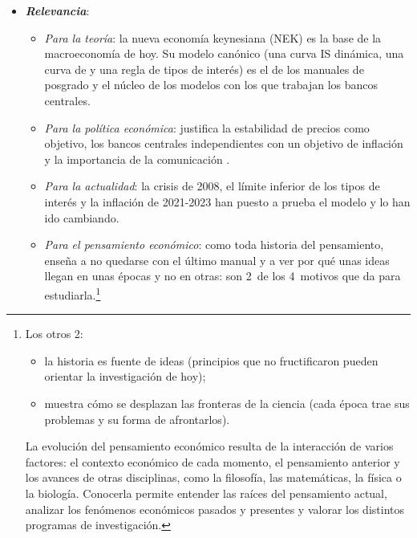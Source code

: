 \documentclass[11pt]{article}
\begin{document}
\begin{itemize}
\item \textbf{\emph{Relevancia}}:
  \begin{itemize}
  \item \emph{Para la teoría}: la nueva economía keynesiana (NEK) es la base de la macroeconomía de hoy. Su modelo canónico (una curva IS dinámica, una curva de  y una regla de tipos de interés) es el de los manuales de posgrado\nocite{Gali2015Monetary} y el núcleo de los modelos con los que trabajan los bancos centrales\nocite{SmetsWouters2007Shocks}.
  \item \emph{Para la política económica}: justifica la estabilidad de precios como objetivo, los bancos centrales independientes con un objetivo de inflación y la importancia de la comunicación\nocite{ClaridaGaliGertler1999Science,Woodford2003Interest} .
  \item \emph{Para la actualidad}: la crisis de 2008, el límite inferior de los tipos de interés y la inflación de 2021-2023 han puesto a prueba el modelo y lo han ido cambiando\nocite{Gali2018State,BernankeBlanchard2025What}.
  \item \emph{Para el pensamiento económico}: como toda historia del pensamiento, enseña a no quedarse con el último manual y a ver por qué unas ideas llegan en unas épocas y no en otras: son 2~de los 4~motivos que da  para estudiarla\nocite{Schumpeter1954History}.\footnote{Los otros 2:
\begin{itemize}
\item la historia es fuente de ideas (principios que no fructificaron pueden orientar la investigación de hoy);
\item muestra cómo se desplazan las fronteras de la ciencia (cada época trae sus problemas y su forma de afrontarlos).
\end{itemize}
La evolución del pensamiento económico resulta de la interacción de varios factores: el contexto económico de cada momento, el pensamiento anterior y los avances de otras disciplinas, como la filosofía, las matemáticas, la física o la biología. Conocerla permite entender las raíces del pensamiento actual, analizar los fenómenos económicos pasados y presentes y valorar los distintos programas de investigación.}
  \end{itemize}


\end{itemize}
\end{document}
